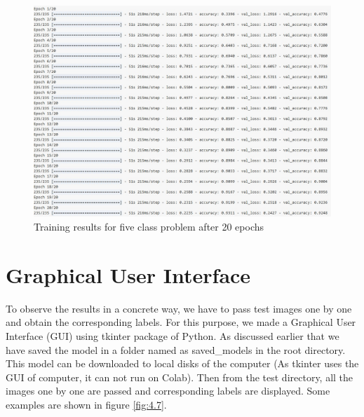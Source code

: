 \begin{figure}[H]
    \centering
    \captionsetup{justification = centering}
    \includegraphics[scale = 0.68]{CHAPTERS/Chapter-4/Images/4.6}
    \caption{Training results for five class problem after 20 epochs} 
    \label{fig:4.6}
\end{figure}
\section{Graphical User Interface}
To observe the results in a concrete way, we have to pass test images
one by one and obtain the corresponding labels. For this purpose,
we made a Graphical User Interface (GUI) using tkinter package of Python.
As discussed earlier that we have saved the model in a folder named
as saved\_models in the root directory. This model can be downloaded to local
disks of the computer (As tkinter uses the GUI of computer, it can not
run on Colab). Then from the test directory, all the images one by one are passed
and corresponding labels are displayed. Some examples are shown in
figure \ref{fig:4.7}.

